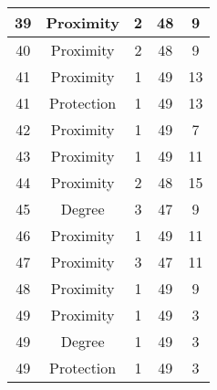 \documentclass[results.tex]{subfiles}
\begin{document}
\begin{center}
\begin{tabular}{| c || c | c | c | c |}
    \hline
    39 & Proximity & 2 & 48 & 9 \\ 
    \hline
    40 & Proximity & 2 & 48 & 9 \\ 
    \hline
    41 & Proximity & 1 & 49 & 13 \\ 
    \hline
    41 & Protection & 1 & 49 & 13 \\ 
    \hline
    42 & Proximity & 1 & 49 & 7 \\ 
    \hline
    43 & Proximity & 1 & 49 & 11 \\ 
    \hline
    44 & Proximity & 2 & 48 & 15 \\ 
    \hline
    45 & Degree & 3 & 47 & 9 \\ 
    \hline
    46 & Proximity & 1 & 49 & 11 \\ 
    \hline
    47 & Proximity & 3 & 47 & 11 \\ 
    \hline
    48 & Proximity & 1 & 49 & 9 \\ 
    \hline
    49 & Proximity & 1 & 49 & 3 \\ 
    \hline
    49 & Degree & 1 & 49 & 3 \\ 
    \hline
    49 & Protection & 1 & 49 & 3 \\ 
    \hline   \end{tabular}
\end{center}
\end{document}
